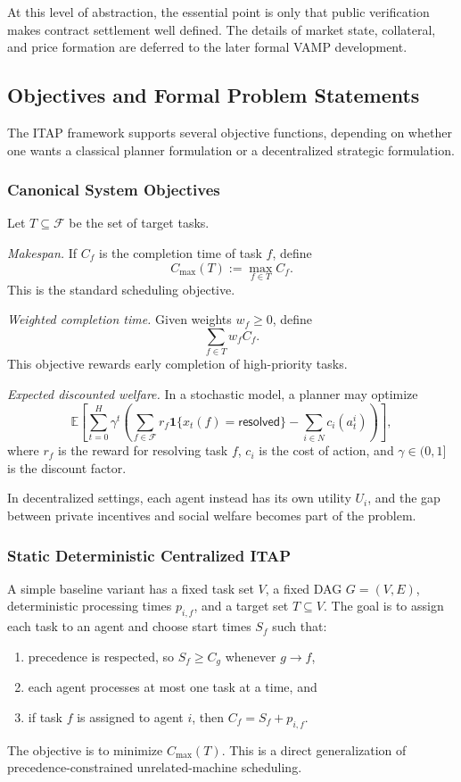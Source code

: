 At this level of abstraction, the essential point is only that public verification makes contract settlement well defined. The details of market state, collateral, and price formation are deferred to the later formal VAMP development.

\subsection{Objectives and Formal Problem Statements}

The ITAP framework supports several objective functions, depending on whether one wants a classical planner formulation or a decentralized strategic formulation.

\subsubsection{Canonical System Objectives}

Let \(T \subseteq \mathcal{F}\) be the set of target tasks.

\textit{Makespan.}
If \(C_f\) is the completion time of task \(f\), define
\[
  C_{\max}(T) := \max_{f\in T} C_f.
\]
This is the standard scheduling objective.

\textit{Weighted completion time.}
Given weights \(w_f \ge 0\), define
\[
  \sum_{f\in T} w_f C_f.
\]
This objective rewards early completion of high-priority tasks.

\textit{Expected discounted welfare.}
In a stochastic model, a planner may optimize
\[
  \mathbb{E}\!\left[
    \sum_{t=0}^{H}
    \gamma^t
    \left(
      \sum_{f\in\mathcal{F}} r_f \mathbf{1}\{x_t(f)=\mathsf{resolved}\}
      -
      \sum_{i\in N} c_i(a_t^i)
    \right)
  \right],
\]
where \(r_f\) is the reward for resolving task \(f\), \(c_i\) is the cost of action, and \(\gamma\in(0,1]\) is the discount factor.

In decentralized settings, each agent instead has its own utility \(U_i\), and the gap between private incentives and social welfare becomes part of the problem.

\subsubsection{Static Deterministic Centralized ITAP}

A simple baseline variant has a fixed task set \(V\), a fixed DAG \(G=(V,E)\), deterministic processing times \(p_{i,f}\), and a target set \(T \subseteq V\). The goal is to assign each task to an agent and choose start times \(S_f\) such that:
\begin{enumerate}
\item precedence is respected, so \(S_f \ge C_g\) whenever \(g \to f\),
\item each agent processes at most one task at a time, and
\item if task \(f\) is assigned to agent \(i\), then \(C_f = S_f + p_{i,f}\).
\end{enumerate}
The objective is to minimize \(C_{\max}(T)\). This is a direct generalization of precedence-constrained unrelated-machine scheduling.

